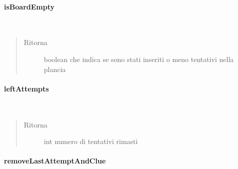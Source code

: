 \documentclass[letterpaper,10pt,italian,openany,oneside]{sphinxmanual}
\begin{document}
\paragraph{isBoardEmpty}
\label{\detokenize{source/it/unicam/cs/pa/mastermind/gamecore/BoardModel:isboardempty}}

\begin{fulllineitems}
\label{\detokenize{source/it/unicam/cs/pa/mastermind/gamecore/BoardModel:it.unicam.cs.pa.mastermind.gamecore.BoardModel.isBoardEmpty()}}~\begin{quote}\begin{description}
\item[{Ritorna}] \leavevmode
boolean che indica se sono stati inseriti o meno tentativi nella plancia

\end{description}\end{quote}

\end{fulllineitems}



\paragraph{leftAttempts}
\label{\detokenize{source/it/unicam/cs/pa/mastermind/gamecore/BoardModel:leftattempts}}

\begin{fulllineitems}
\label{\detokenize{source/it/unicam/cs/pa/mastermind/gamecore/BoardModel:it.unicam.cs.pa.mastermind.gamecore.BoardModel.leftAttempts()}}~\begin{quote}\begin{description}
\item[{Ritorna}] \leavevmode
int numero di tentativi rimasti

\end{description}\end{quote}

\end{fulllineitems}



\paragraph{removeLastAttemptAndClue}
\label{\detokenize{source/it/unicam/cs/pa/mastermind/gamecore/BoardModel:removelastattemptandclue}}
\end{document}
